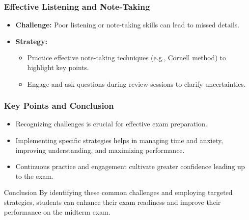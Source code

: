 \documentclass{beamer}
\begin{document}
\begin{frame}[fragile]
    \frametitle{Effective Listening and Note-Taking}
    \begin{itemize}
        \item \textbf{Challenge:} Poor listening or note-taking skills can lead to missed details.
        \item \textbf{Strategy:}
        \begin{itemize}
            \item Practice effective note-taking techniques (e.g., Cornell method) to highlight key points.
            \item Engage and ask questions during review sessions to clarify uncertainties.
        \end{itemize}
    \end{itemize}
\end{frame}

\begin{frame}[fragile]
    \frametitle{Key Points and Conclusion}
    \begin{itemize}
        \item Recognizing challenges is crucial for effective exam preparation.
        \item Implementing specific strategies helps in managing time and anxiety, improving understanding, and maximizing performance.
        \item Continuous practice and engagement cultivate greater confidence leading up to the exam.
    \end{itemize}
    
    \begin{block}{Conclusion}
        By identifying these common challenges and employing targeted strategies, students can enhance their exam readiness and improve their performance on the midterm exam.
    \end{block}
\end{frame}
\end{document}
